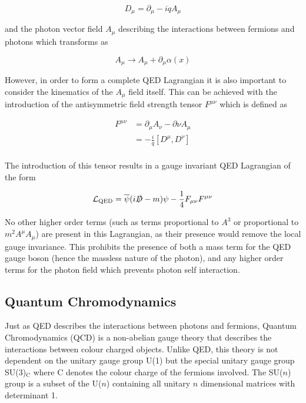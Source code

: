 \documentclass[12pt,a4paper,epsf,portrait,times,epsfig]{report}
\begin{document}
	\begin{equation}
		D_{\mu} = \partial_{\mu} - iqA_{\mu}
	\end{equation}

	and the photon vector field $A_{\mu}$ describing the interactions between fermions and photons which transforms as
	
	\begin{equation}
		A_{\mu} \rightarrow A_{\mu} + \partial_{\mu}\alpha(x)
	\end{equation}
	
	However, in order to form a complete QED Lagrangian it is also important to consider the kinematics of the $A_{\mu}$ field itself. This can be achieved with the introduction of the antisymmetric field strength tensor $F^{\mu\nu}$ which is defined as

	\begin{equation}
		\begin{split}
		F^{\mu\nu} &= \partial_{\mu}A_{\nu} - \partial{\nu}A_{\mu} \\
		&= -\frac{i}{q}[D^{\mu},D^{\nu}] \\
		\end{split}
	\end{equation}

	The introduction of this tensor results in a gauge invariant QED Lagrangian of the form

	\begin{equation}
		\mathcal{L}_{\mathrm{QED}}=\overline{\psi}(i\slashed{D}-m)\psi - \frac{1}{4}F_{\mu\nu}F^{\mu\nu}
	\end{equation}

	No other higher order terms (such as terms proportional to $A^{3}$ or proportional to $m^{2}A^{\mu}A_{\mu}$) are present in this Lagrangian, as their presence would remove the local gauge invariance. This prohibits the presence of both a mass term for the QED gauge boson (hence the massless nature of the photon), and any higher order terms for the photon field which prevents photon self interaction. 

	\subsection{Quantum Chromodynamics} \label{Section:QCD}

	Just as QED describes the interactions between photons and fermions, Quantum Chromodynamics (QCD) is a non-abelian gauge theory that describes the interactions between colour charged objects. Unlike QED, this theory is not dependent on the unitary gauge group U(1) but the special unitary gauge group SU(3)$_{\mathrm{C}}$ where C denotes the colour charge of the fermions involved. The SU($n$) group is a subset of the U($n$) containing all unitary $n$ dimensional matrices with determinant 1. \par
\end{document}
